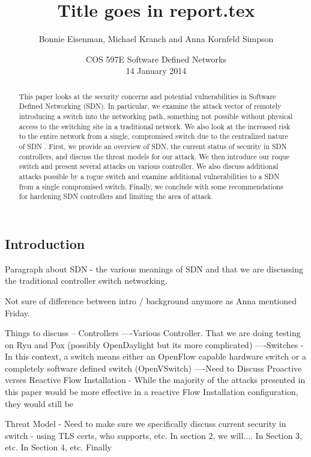 \documentclass[12pt, letterpaper, twoside]{article}
\title{Title goes in report.tex}
\author{Bonnie Eisenman, Michael Kranch and Anna Kornfeld Simpson}
\date{COS 597E Software Defined Networks \\ 14 January 2014}
\begin{document}
\maketitle

\begin{spacing}{1.0}

\begin{abstract}
This paper looks at the security concerns and potential vulnerabilities in Software Defined Networking (SDN). In particular, we examine the attack vector of remotely introducing a switch into the networking path, something not possible without physical access to the switching site in a traditional network. We also look at the increased risk to the entire network from a single, compromised switch due to the centralized nature of SDN . First, we provide an overview of SDN, the current status of security in SDN controllers, and discuss the threat models for our attack. We then introduce our roque switch and present several  attacks on various controller. We also discuss additional attacks possible by a rogue switch and examine additional vulnerabilities to a SDN from a single compromised switch. Finally, we conclude with some recommendations for hardening SDN controllers and limiting the area of attack.
\end{abstract}

\begin{multicols}{2}

\section{Introduction}
Paragraph about SDN - the various meanings of SDN and that we are discussing the traditional controller switch networking.

Not sure of difference between intro / background anymore as Anna mentioned Friday.

Things to discuss
-- Controllers
----Various Controller. That we are doing testing on Ryu and Pox (possibly OpenDaylight but its more complicated)
----Switches - In this context, a switch means either an OpenFlow capable hardware switch or a completely software defined switch (OpenVSwitch)
----Need to Discuss Proactive verses Reactive Flow Installation - While the majority of the attacks presented in this paper would be more effective in a reactive Flow Installation configuration, they would still be 

Threat Model
- Need to make sure we specifically discuss current security in switch - using TLS certs, who supports, etc.
In section 2, we will.... In Section 3, etc. In Section 4, etc. Finally


\end{multicols}
\end{spacing}
\end{document}
